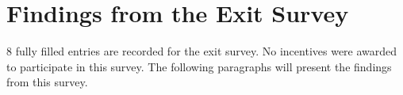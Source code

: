 %

\section{Findings from the Exit Survey}

8 fully filled entries are recorded for the exit survey. No incentives were awarded to participate in this survey. The following paragraphs will present the findings from this survey.


